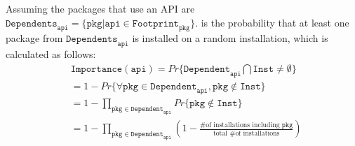 \noindent
Assuming the packages that use an API are  
$\mathtt{Dependents}_\mathtt{api} = \{\mathtt{pkg}|\mathtt{api} \in \mathtt{Footprint}_\mathtt{pkg}\}$.
\Usagemetric{} is the probability that at least one package
from $\mathtt{Dependents}_\mathtt{api}$ is installed on a random installation, which is calculated as follows:
\begin{align*}
&\mathtt{Importance}(\mathtt{api}) = Pr\{\mathtt{Dependent}_\mathtt{api} \bigcap \mathtt{Inst} \neq \emptyset\} \\
&= 1 - Pr\{\forall \mathtt{pkg} \in \mathtt{Dependent}_\mathtt{api}, \mathtt{pkg} \notin \mathtt{Inst}\} \\
&= 1 - \prod_{\mathtt{pkg} \in \mathtt{Dependent}_\mathtt{api}} Pr\{\mathtt{pkg} \notin \mathtt{Inst}\} \\
&= 1 - \prod_{\mathtt{pkg} \in \mathtt{Dependent}_\mathtt{api}} (1 - \frac{\text{\# of installations including $\mathtt{pkg}$}}{\text{total \# of installations}})
\end{align*}

\papersection{\Compatmetric{}}
\label{sec:defs:compatmetric}





\begin{comment}
We defined {\bf platform compatibility} as "{\em the probability of porting any installation of an OS distribution onto the target OS without any effort}".
The definition of an {\em installation} is a combination of application setup on a standalone OS instance.
An Installation can exist on physical machines,
or any machines of generalized sense such as a virtual machines, containers or subsystems.
In our model, installations represent customers of the OS, who are considered equal when providing any services.
\end{comment}

